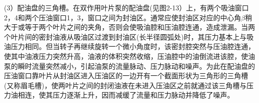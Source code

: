 \par (3）配油盘的三角槽。在双作用叶片泵的配油盘(见图2-13）上，有两个吸油窗口2，4和两个压油窗口1，3，窗口之间为封油区。通常应使封油区对应的中心角$\beta$稍大于或等于两个叶片之间的夹角，否则会使吸油腔和压油腔连通，造成泄漏。当两个叶片间的密封油液从吸油区过渡到封油区(长半径圆弧处)时，其压力基本上与吸油压力相同。但当转子再继续旋转一个微小角度时，该密封腔突然与压油腔连通，使其中油液压力突然升高，油液的体积突然收缩，压油腔中的油倒流进该腔，使油泵的瞬时流量突然减小，引起油泵的流量脉动、压力脉动和噪声。为此在配油盘的压油窗口靠叶片从封油区进入压油区的一边开有一个截面形状为三角形的三角槽(又称眉毛槽)，使两叶片之间的封闭油液在未进入压油区之前就通过该三角槽与压力油相连，使其压力逐渐上升，因而减缓了流量和压力脉动并降低了噪声。